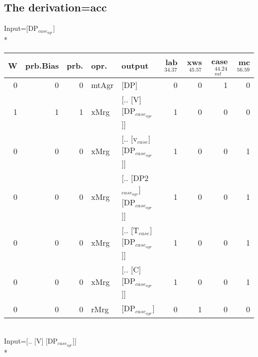 \subsection{The derivation=acc}
\begingroup\scriptsize Input=[DP$_{case_{agr}}$]\\*
\begin{tabularx}{\linewidth}{rrrlXrrrr}
\hline
   W &   prb.Bias &   prb. & opr.    & output                            &   lab$^{34.37}$ &   xws$^{45.57}$ &   case$_{mt}^{44.24}$ &   mc$^{56.59}$ \\
\hline
   0 &       0 &   0 & mtAgr & [DP]                              &             0 &             0 &                 1 &            0 \\
   1 &       1 &   1 & xMrg  & [.. [V] [DP$_{case_{agr}}$]]            &             1 &             0 &                 0 &            0 \\
   0 &       0 &   0 & xMrg  & [.. [v$_{case}$] [DP$_{case_{agr}}$]]       &             1 &             0 &                 0 &            1 \\
   0 &       0 &   0 & xMrg  & [.. [DP2$_{case_{agr}}$] [DP$_{case_{agr}}$]] &             1 &             0 &                 0 &            1 \\
   0 &       0 &   0 & xMrg  & [.. [T$_{case}$] [DP$_{case_{agr}}$]]       &             1 &             0 &                 0 &            1 \\
   0 &       0 &   0 & xMrg  & [.. [C] [DP$_{case_{agr}}$]]            &             1 &             0 &                 0 &            1 \\
   0 &       0 &   0 & rMrg  & [DP$_{case_{agr}}$]                     &             0 &             1 &                 0 &            0 \\
\hline
\end{tabularx}\endgroup\\
\begingroup\scriptsize Input=[.. [V] [DP$_{case_{agr}}$]]\\*
